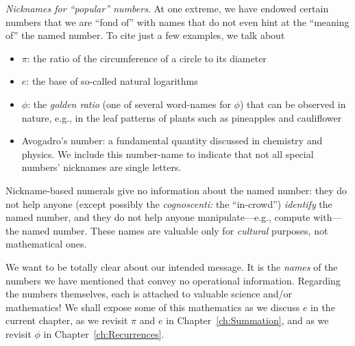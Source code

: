{}
{}
{}

\noindent
{\it Nicknames for ``popular'' numbers}.
%
At one extreme, we have endowed certain numbers that we are ``fond
of'' with names that do not even hint at the ``meaning of'' the named
number.  To cite just a few examples, we talk about
\begin{itemize}
\item
$\pi$: the ratio of the circumference of a circle to its diameter
\item
$e$: the base of so-called natural logarithms
\item
$\phi$: the {\it golden ratio} (one of several word-names for $\phi$)
  that can be observed in nature, e.g., in the leaf patterns of plants
  such as pineapples and cauliflower
{}
{}
\item
Avogadro's number: a fundamental quantity discussed in chemistry and
physics.  We include this number-name to indicate that not all
special numbers' nicknames are single letters.
\end{itemize}
Nickname-based numerals give no information about the named number:
they do not help anyone (except possibly the {\it cognoscenti:} the
``in-crowd'') {\em identify} the named number, and they do not help
anyone manipulate---e.g., compute with---the named number.  These
names are valuable only for {\em cultural} purposes, not mathematical
ones.

We want to be totally clear about our intended message.  It is the
{\em names} of the numbers we have mentioned that convey no
operational information.  Regarding the numbers themselves, each is
attached to valuable science and/or mathematics!  We shall expose some
of this mathematics as we discuss $e$ in the current chapter, as we
revisit $\pi$ and $e$ in Chapter~\ref{ch:Summation}, and as we revisit
$\phi$ in Chapter~\ref{ch:Recurrences}.

